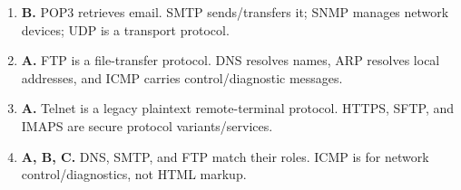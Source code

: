 \begin{enumerate}[label=\textbf{Q\arabic*.}, leftmargin=*]
\item \textbf{B.} POP3 retrieves email. SMTP sends/transfers it; SNMP manages network devices; UDP is a transport protocol.

\item \textbf{A.} FTP is a file-transfer protocol. DNS resolves names, ARP resolves local addresses, and ICMP carries control/diagnostic messages.

\item \textbf{A.} Telnet is a legacy plaintext remote-terminal protocol. HTTPS, SFTP, and IMAPS are secure protocol variants/services.

\item \textbf{A, B, C.} DNS, SMTP, and FTP match their roles. ICMP is for network control/diagnostics, not HTML markup.

\end{enumerate}
